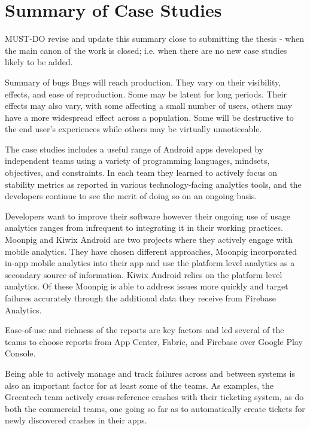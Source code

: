 \section{Summary of Case Studies}
MUST-DO revise and update this summary close to submitting the thesis - when the main canon of the work is closed; i.e. when there are no new case studies likely to be added.

Summary of bugs
Bugs will reach production. They vary on their visibility, effects, and ease of reproduction. Some may be latent for long periods. Their effects may also vary, with some affecting a small number of users, others may have a more widespread effect across a population. Some will be destructive to the end user's experiences while others may be virtually unnoticeable. 





The case studies includes a useful range of Android apps developed by independent teams using a variety of programming languages, mindsets, objectives, and constraints. In each team they learned to actively focus on stability metrics as reported in various technology-facing analytics tools, and the developers continue to see the merit of doing so on an ongoing basis.

Developers want to improve their software however their ongoing use of usage analytics ranges from infrequent to integrating it in their working practices. Moonpig and Kiwix Android are two projects where they actively engage with mobile analytics. They have chosen different approaches, Moonpig incorporated in-app mobile analytics into their app and use the platform level analytics as a secondary source of information. Kiwix Android relies on the platform level analytics. Of these Moonpig is able to address issues more quickly and target failures accurately through the additional data they receive from Firebase Analytics. 

Ease-of-use and richness of the reports are key factors and led several of the teams to choose reports from App Center, Fabric, and Firebase over Google Play Console.

Being able to actively manage and track failures across and between systems is also an important factor for at least some of the teams. As examples, the Greentech team actively cross-reference crashes with their ticketing system, as do both the commercial teams, one going so far as to automatically create tickets for newly discovered crashes in their apps.


